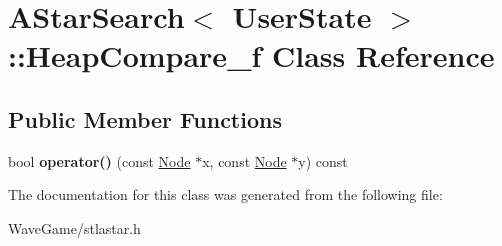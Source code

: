\hypertarget{class_a_star_search_1_1_heap_compare__f}{}\section{A\+Star\+Search$<$ User\+State $>$\+:\+:Heap\+Compare\+\_\+f Class Reference}
\label{class_a_star_search_1_1_heap_compare__f}
\subsection*{Public Member Functions}
\begin{DoxyCompactItemize}
\item 
\mbox{\label{class_a_star_search_1_1_heap_compare__f_a470f1b699b682dc8c4b4b490372bd8ff}} 
bool {\bfseries operator()} (const \hyperlink{class_a_star_search_1_1_node}{Node} $\ast$x, const \hyperlink{class_a_star_search_1_1_node}{Node} $\ast$y) const
\end{DoxyCompactItemize}


The documentation for this class was generated from the following file\+:\begin{DoxyCompactItemize}
\item 
Wave\+Game/stlastar.\+h\end{DoxyCompactItemize}
